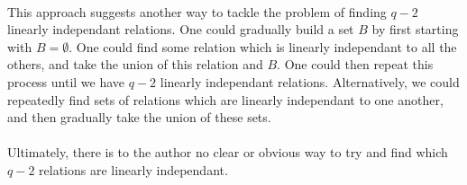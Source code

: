 \documentclass[11pt]{article}
\theoremstyle{plain}
\theoremstyle{definition}
\begin{document}
\\
This approach suggests another way to tackle the problem of finding $q-2$ linearly independant relations. One could gradually build a set $B$ by first starting with $B= \emptyset$. One could find some relation which is linearly independant to all the others, and take the union of this relation and $B$. One could then repeat this process until we have $q-2$ linearly independant relations. Alternatively, we could repeatedly find sets of relations which are linearly independant to one another, and then gradually take the union of these sets.\\
\\
Ultimately, there is to the author no clear or obvious way to try and find which $q-2$ relations are linearly independant. \\
\\
\pagebreak
\end{document}
